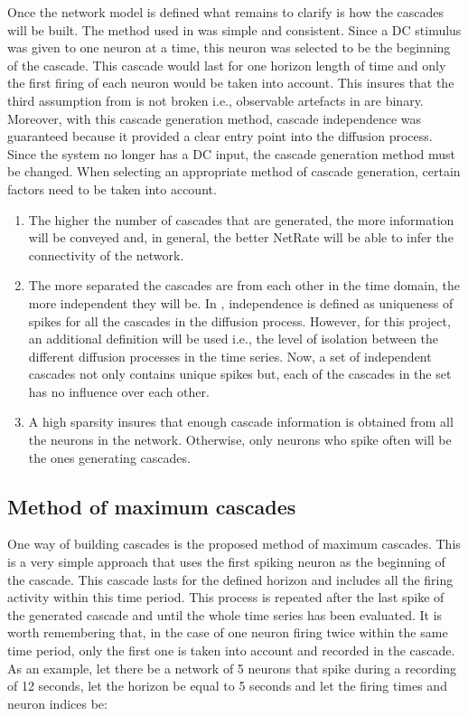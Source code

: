 Once the network model is defined what remains to clarify is how the cascades will be built. The method used in \cite{alexandru2018estimating} was simple and consistent. Since a DC stimulus was given to one neuron at a time, this neuron was selected to be the beginning of the cascade. This cascade would last for one horizon length of time and only the first firing of each neuron would be taken into account. This insures that the third assumption from \cite{rodriguez2011uncovering} is not broken i.e., observable artefacts in are binary. Moreover, with this cascade generation method, cascade independence was guaranteed because it provided a clear entry point into the diffusion process. Since the system no longer has a DC input, the cascade generation method must be changed. When selecting an appropriate method of cascade generation, certain factors need to be taken into account.
\begin{enumerate}
\item The higher the number of cascades that are generated, the more information will be conveyed and, in general, the better NetRate will be able to infer the connectivity of the network. 
\item The more separated the cascades are from each other in the time domain, the more independent they will be. In \cite{rodriguez2011uncovering}, independence is defined as uniqueness of spikes for all the cascades in the diffusion process. However, for this project, an additional definition will be used i.e., the level of isolation between the different diffusion processes in the time series. Now, a set of independent cascades not only contains unique spikes but, each of the cascades in the set has no influence over each other.
\item A high sparsity insures that enough cascade information is obtained from all the neurons in the network. Otherwise, only neurons who spike often will be the ones generating cascades.
\end{enumerate}

\subsection{Method of maximum cascades}

One way of building cascades is the proposed method of maximum cascades. This is a very simple approach that uses the first spiking neuron as the beginning of the cascade. This cascade lasts for the defined horizon and includes all the firing activity within this time period. This process is repeated after the last spike of the generated cascade and until the whole time series has been evaluated. It is worth remembering that, in the case of one neuron firing twice within the same time period, only the first one is taken into account and recorded in the cascade. As an example, let there be a network of 5 neurons that spike during a recording of 12 seconds, let the horizon be equal to 5 seconds and let the firing times and neuron indices be:

